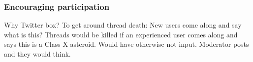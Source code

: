 \documentclass{sigchi}
\begin{document}

\subsubsection{Encouraging participation}



Why Twitter box?  To get around thread death: New users come along and say what is this? Threads would be killed if an experienced user comes along and says this is a Class X asteroid. Would have otherwise not input. Moderator posts and they would think. %






\end{document}
